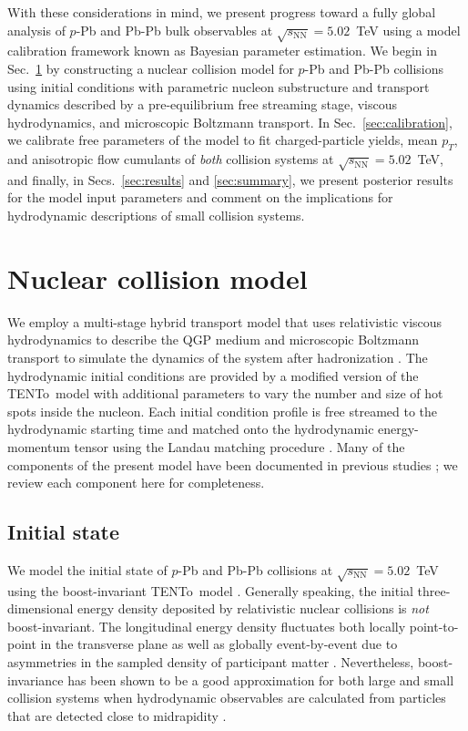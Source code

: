 \documentclass[aps,prc,reprint,amsmath,nofootinbib]{revtex4-1}
\newcommand{\trento}{T\raisebox{-0.5ex}{R}ENTo}
\newcommand{\sqrts}{\sqrt{s_\mathrm{NN}}}
\begin{document}
With these considerations in mind, we present progress toward a fully global analysis of $p$-Pb and Pb-Pb bulk observables at $\sqrts=5.02$~TeV using a model calibration framework known as Bayesian parameter estimation.
We begin in Sec.~\ref{sec:model} by constructing a nuclear collision model for $p$-Pb and Pb-Pb collisions using initial conditions with parametric nucleon substructure and transport dynamics described by a pre-equilibrium free streaming stage, viscous hydrodynamics, and microscopic Boltzmann transport.
In Sec.~\ref{sec:calibration}, we calibrate free parameters of the model to fit charged-particle yields, mean $p_T$, and anisotropic flow cumulants of \emph{both} collision systems at $\sqrts=5.02$~TeV, and finally, in Secs.~\ref{sec:results} and \ref{sec:summary}, we present posterior results for the model input parameters and comment on the implications for hydrodynamic descriptions of small collision systems.

\section{Nuclear collision model}
\label{sec:model}

We employ a multi-stage hybrid transport model that uses relativistic viscous hydrodynamics to describe the QGP medium and microscopic Boltzmann transport to simulate the dynamics of the system after hadronization \cite{Shen:2014vra, Bernhard:2016tnd}.
The hydrodynamic initial conditions are provided by a modified version of the \trento\ model \cite{Moreland:2014oya} with additional parameters to vary the number and size of hot spots inside the nucleon.
Each initial condition profile is free streamed to the hydrodynamic starting time and matched onto the hydrodynamic energy-momentum tensor using the Landau matching procedure \cite{Broniowski:2008qk, Heinz:2015arc}.
Many of the components of the present model have been documented in previous studies \cite{Moreland:2014oya, Bernhard:2016tnd, Bernhard:2018hnz}; we review each component here for completeness.

\subsection{Initial state}
\label{sec:initial_state}

We model the initial state of $p$-Pb and Pb-Pb collisions at $\sqrts=5.02$~TeV using the boost-invariant \trento\ model \cite{Moreland:2014oya}.
Generally speaking, the initial three-dimensional energy density deposited by relativistic nuclear collisions is \emph{not} boost-invariant.
The longitudinal energy density fluctuates both locally point-to-point in the transverse plane as well as globally event-by-event due to asymmetries in the sampled density of participant matter \cite{Ke:2016jrd, Bozek:2010vz}.
Nevertheless, boost-invariance has been shown to be a good approximation for both large and small collision systems when hydrodynamic observables are calculated from particles that are detected close to midrapidity \cite{Shen:2016zpp}.
\end{document}
